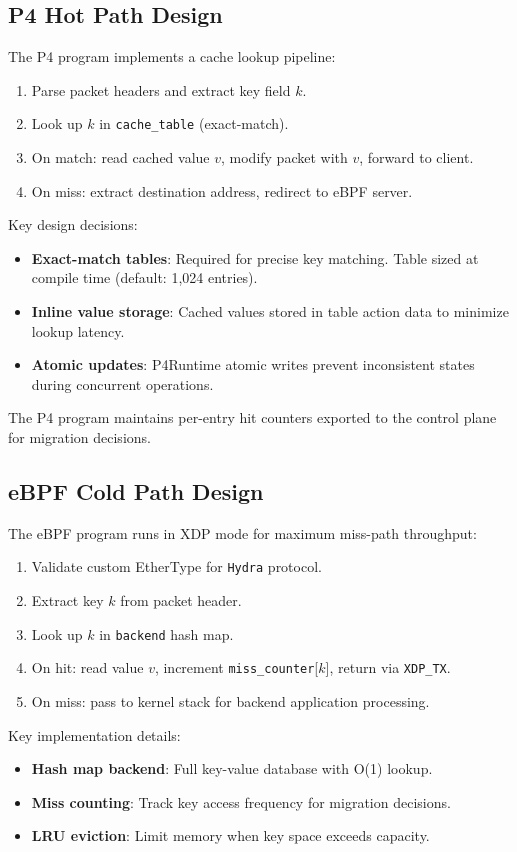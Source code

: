 \documentclass[sigconf,anonymous,10pt]{acmart}
\newcommand{\hydra}{\texttt{Hydra}}
\begin{document}
\subsection{P4 Hot Path Design}
The P4 program implements a cache lookup pipeline:
\begin{enumerate}
    \item Parse packet headers and extract key field $k$.
    \item Look up $k$ in \texttt{cache\_table} (exact-match).
    \item On match: read cached value $v$, modify packet with $v$, forward to client.
    \item On miss: extract destination address, redirect to eBPF server.
\end{enumerate}

Key design decisions:
\begin{itemize}
    \item \textbf{Exact-match tables}: Required for precise key matching. Table sized at compile time (default: 1,024 entries).
    \item \textbf{Inline value storage}: Cached values stored in table action data to minimize lookup latency.
    \item \textbf{Atomic updates}: P4Runtime atomic writes prevent inconsistent states during concurrent operations.
\end{itemize}

The P4 program maintains per-entry hit counters exported to the control plane for migration decisions.

\subsection{eBPF Cold Path Design}
The eBPF program runs in XDP mode for maximum miss-path throughput:
\begin{enumerate}
    \item Validate custom EtherType for \hydra{} protocol.
    \item Extract key $k$ from packet header.
    \item Look up $k$ in \texttt{backend} hash map.
    \item On hit: read value $v$, increment \texttt{miss\_counter}[$k$], return via \texttt{XDP\_TX}.
    \item On miss: pass to kernel stack for backend application processing.
\end{enumerate}

Key implementation details:
\begin{itemize}
    \item \textbf{Hash map backend}: Full key-value database with O(1) lookup.
    \item \textbf{Miss counting}: Track key access frequency for migration decisions.
    \item \textbf{LRU eviction}: Limit memory when key space exceeds capacity.
\end{itemize}
\end{document}
